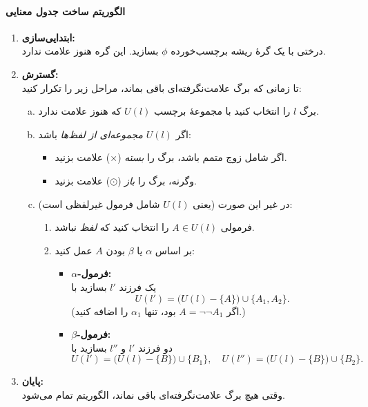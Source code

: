   \paragraph{ الگوریتم ساخت جدول معنایی}
  \begin{enumerate}[1.]
    \item \textbf{ابتدایی‌سازی:}\\
      درختی با یک گرهٔ ریشه برچسب‌خورده $\phi$ بسازید. این گره هنوز علامت ندارد.
    \item \textbf{گسترش:}\\
      تا زمانی که برگ علامت‌نگرفته‌ای باقی بماند، مراحل زیر را تکرار کنید:
      \begin{enumerate}[a)]
        \item برگ $l$ را انتخاب کنید با مجموعهٔ برچسب $U(l)$ که هنوز علامت ندارد.
        \item اگر $U(l)$ \emph{مجموعه‌ای از لفظ‌ها} باشد:
          \begin{itemize}
            \item اگر شامل زوج متمم باشد، برگ را \emph{بسته} ($\times$) علامت بزنید.
            \item وگرنه، برگ را \emph{باز} ($\odot$) علامت بزنید.
          \end{itemize}
        \item در غیر این صورت (یعنی $U(l)$ شامل فرمول غیرلفظی است):
          \begin{enumerate}[(i]
            \item فرمولی $A\in U(l)$ را انتخاب کنید که \emph{لفظ} نباشد.
            \item بر اساس $\alpha$ یا $\beta$ بودن $A$ عمل کنید:
              \begin{itemize}
                \item \textbf{$\alpha$-فرمول:}\\
                  یک فرزند $l'$ بسازید با
                  \[
                  U(l') = \bigl(U(l) - \{A\}\bigr)\cup\{A_1,A_2\}.
                  \]
                  (اگر $A=\neg\neg A_1$ بود، تنها $\alpha_1$ را اضافه کنید.)
                \item \textbf{$\beta$-فرمول:}\\
                  دو فرزند $l'$ و $l''$ بسازید با
                  \[
                  U(l') = \bigl(U(l) - \{B\}\bigr)\cup\{B_1\},\quad
                  U(l'') = \bigl(U(l) - \{B\}\bigr)\cup\{B_2\}.
                  \]
              \end{itemize}
          \end{enumerate}
      \end{enumerate}
    \item \textbf{پایان:}\\
      وقتی هیچ برگ علامت‌نگرفته‌ای باقی نماند، الگوریتم تمام می‌شود.
  \end{enumerate}
  

